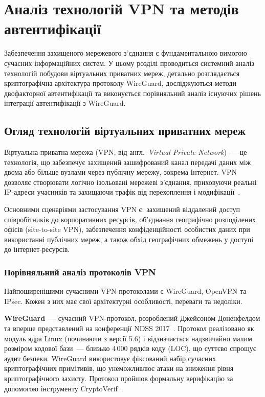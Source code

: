 \chapter{Аналіз технологій VPN та методів автентифікації}

Забезпечення захищеного мережевого з'єднання є фундаментальною вимогою сучасних
інформаційних систем. У цьому розділі проводиться системний аналіз технологій
побудови віртуальних приватних мереж, детально розглядається криптографічна
архітектура протоколу WireGuard, досліджуються методи двофакторної автентифікації
та виконується порівняльний аналіз існуючих рішень інтеграції автентифікації
з WireGuard.

\section{Огляд технологій віртуальних приватних мереж}

Віртуальна приватна мережа (VPN, від англ.\ \textit{Virtual Private Network})~---
це технологія, що забезпечує захищений зашифрований канал передачі даних між
двома або більше вузлами через публічну мережу, зокрема Інтернет. VPN дозволяє
створювати логічно ізольовані мережеві з'єднання, приховуючи реальні IP-адреси
учасників та захищаючи трафік від перехоплення і модифікації~\cite{stallings2019network}.

Основними сценаріями застосування VPN є: захищений віддалений доступ співробітників
до корпоративних ресурсів, об'єднання географічно розподілених офісів
(site-to-site VPN), забезпечення конфіденційності особистих даних при використанні
публічних мереж, а також обхід географічних обмежень у доступі до інтернет-ресурсів.

\subsection{Порівняльний аналіз протоколів VPN}

Найпоширенішими сучасними VPN-протоколами є WireGuard, OpenVPN
та IPsec. Кожен з них має свої архітектурні особливості, переваги та недоліки.

\textbf{WireGuard}~--- сучасний VPN-протокол, розроблений Джейсоном Доненфелдом
та вперше представлений на конференції NDSS 2017~\cite{donenfeld2017wireguard}.
Протокол реалізовано як модуль ядра Linux (починаючи з версії 5.6) і
відзначається надзвичайно малим розміром кодової бази~--- близько 4\,000 рядків
коду (LOC), що суттєво спрощує аудит безпеки. WireGuard використовує фіксований
набір сучасних криптографічних примітивів, що унеможливлює атаки на зниження
рівня криптографічного захисту. Протокол пройшов формальну верифікацію
за допомогою інструменту CryptoVerif~\cite{lipp2019cryptographic, blanchet2008cryptoverif}.


